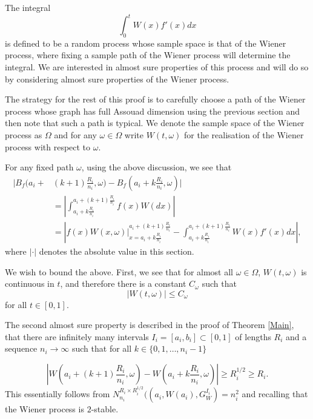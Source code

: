 	The integral 
	\[
	\int_0^{t} W(x)f'(x)dx
	\]
	is defined to be a random process whose sample space is that of the Wiener process, where fixing a sample path of the Wiener process will determine the integral. We are interested in almost sure properties of this process and will do so by considering almost sure properties of the Wiener process.
	
	The strategy for the rest of this proof is to carefully choose a path of the Wiener process whose graph has full Assouad dimension using the previous section and then note that such a path is typical. We denote the sample space of the Wiener process as $\Omega$ and for any $\omega \in \Omega$ write $W(t,\omega)$ for the realisation of the Wiener process with respect to $\omega$.
	
	For any fixed path $\omega$, using the above discussion, we see that
	\begin{align*}
		\bigg\vert B_f\bigg(a_i+&(k+1)\frac{R_i}{n_i},\omega\bigg)-B_f\left(a_i+k\frac{R_i}{n_i},\omega\right)\bigg\vert\\
		&= \left| \int_{a_i+k\frac{R_i}{n_i}}^{a_i+(k+1)\frac{R_i}{n_i}} f(x)W(dx)\right|\\
		&= \left| f\left(x\right)W(x,\omega)\bigg\vert_{x=a_i+k\frac{R_i}{n_i}}^{a_i+(k+1)\frac{R_i}{n_i}} - \int_{a_i+k\frac{R_i}{n_i}}^{a_i+(k+1)\frac{R_i}{n_i}} W(x)f'(x)dx \right|,
	\end{align*}
	where $\lvert \cdot \rvert$ denotes the absolute value in this section.
	
	We wish to bound the above. First, we see that for almost all $\omega\in\Omega$, $W(t,\omega)$ is continuous in $t$, and therefore there is a constant $C_\omega$ such that
	\begin{equation}
	    |W(t,\omega)|\leq C_\omega \label{first-equa}
	\end{equation}
	for all $t\in [0,1]$. 
	
	The second almost sure property is described in the proof of Theorem \ref{Main}, that there are infinitely many intervals $I_i=[a_i,b_i]\subset [0,1]$ of lengths $R_i$ and a sequence $n_i\to\infty$ such that for all $k\in\{0,1,\dots,n_i-1\}$
	
	\begin{equation}
	    \left|W\left(a_i+(k+1)\frac{R_i}{n_i},\omega\right)-W\left(a_i+k\frac{R_i}{n_i},\omega\right)\right|\geq R_i^{1/2}\geq R_i. \label{ch:brownian:second-equa}
	\end{equation}
	This essentially follows from $N_{n_i}^{R_i \times R_i^{1/2}}((a_i,W(a_i), G_W^{I_i})  = n_i^2$ and recalling that the Wiener process is $2$-stable.
	
